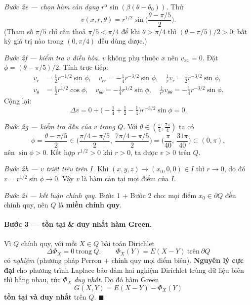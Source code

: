 \emph{Bước 2e --- chọn hàm cản dạng $r^{\alpha}\sin(\beta(\theta-\theta_0))$.} Thử
\[
  v(x,r,\theta)=r^{1/2}\sin\!\Big(\frac{\theta-\pi/5}{2}\Big).
\]
(Tham số $\pi/5$ chỉ cần thoả $\pi/5<\pi/4$ để khi $\theta>\pi/4$ thì $(\theta-\pi/5)/2>0$; bất kỳ giá trị nào trong $(0,\pi/4)$ đều dùng được.)

\emph{Bước 2f --- kiểm tra $v$ điều hòa.} $v$ không phụ thuộc $x$ nên $v_{xx}=0$. Đặt $\phi=(\theta-\pi/5)/2$. Tính trực tiếp:
\begin{align*}
  v_r &= \tfrac{1}{2}r^{-1/2}\sin\phi,\quad
  v_{rr}=-\tfrac{1}{4}r^{-3/2}\sin\phi,\quad
  \tfrac{1}{r}v_r=\tfrac{1}{2}r^{-3/2}\sin\phi,\\[2pt]
  v_\theta &= \tfrac{1}{2}r^{1/2}\cos\phi,\quad
  v_{\theta\theta}=-\tfrac{1}{4}r^{1/2}\sin\phi,\quad
  \tfrac{1}{r^2}v_{\theta\theta}=-\tfrac{1}{4}r^{-3/2}\sin\phi.
\end{align*}
Cộng lại:
\[
  \Delta v=0+\Big(-\tfrac14+\tfrac12-\tfrac14\Big)r^{-3/2}\sin\phi=0.
\]

\emph{Bước 2g --- kiểm tra dấu của $v$ trong $Q$.} Với $\theta\in(\tfrac{\pi}{4},\tfrac{7\pi}{4})$ ta có
\[
  \phi=\frac{\theta-\pi/5}{2}\in\Big(\frac{\pi/4-\pi/5}{2},\ \frac{7\pi/4-\pi/5}{2}\Big)=\Big(\frac{\pi}{40},\ \frac{31\pi}{40}\Big)\subset(0,\pi),
\]
nên $\sin\phi>0$. Kết hợp $r^{1/2}>0$ khi $r>0$, ta được $v>0$ trên $Q$.

\emph{Bước 2h --- $v$ triệt tiêu trên $I$.} Khi $(x,y,z)\to(x_0,0,0)\in I$ thì $r\to0$, do đó $v=r^{1/2}\sin\phi\to0$. Vậy $v$ là hàm cản tại mọi điểm của $I$.

\emph{Bước 2i --- kết luận chính quy.} Bước 1 + Bước 2 cho: mọi điểm $x_0\in\partial Q$ đều chính quy, nên $Q$ là \textbf{miền chính quy}.

\paragraph{Bước 3 --- tồn tại \& duy nhất hàm Green.}\leavevmode

\begin{nhobox}
Vì $Q$ chính quy, với mỗi $X\in Q$ bài toán Dirichlet
\[
  \Delta\Phi_X=0\ \text{trong}\ Q,\qquad \Phi_X(Y)=E(X-Y)\ \text{trên}\ \partial Q
\]
có \emph{nghiệm} (phương pháp Perron + chính quy mọi điểm biên). \textbf{Nguyên lý cực đại} cho phương trình Laplace bảo đảm hai nghiệm Dirichlet trùng dữ liệu biên thì bằng nhau, tức $\Phi_X$ \emph{duy nhất}. Do đó hàm Green
\[
  G(X,Y)=E(X-Y)-\Phi_X(Y)
\]
\textbf{tồn tại và duy nhất} trên $Q$. $\blacksquare$
\end{nhobox}
